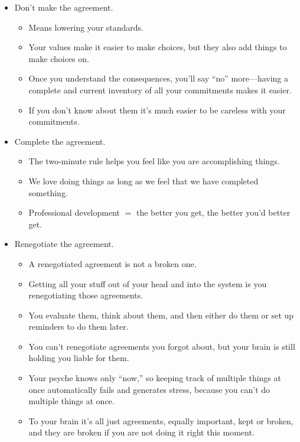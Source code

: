 \documentclass{article}
\begin{document}
\begin{itemize}
 \item Don't make the agreement.
 \begin{itemize}
  \item Means lowering your standards.
  \item Your values make it easier to make choices, but they also add things to make choices on.
  \item Once you understand the consequences, you'll say ``no'' more---having a complete and current inventory of all your commitments makes it easier.
  \item If you don't know about them it's much easier to be careless with your commitments.
 \end{itemize}
 \item Complete the agreement.
 \begin{itemize}
  \item The two-minute rule helps you feel like you are accomplishing things.
  \item We love doing things as long as we feel that we have completed something.
  \item Professional development $=$ the better you get, the better you'd better get.
 \end{itemize}
 \item Renegotiate the agreement.
 \begin{itemize}
  \item A renegotiated agreement is not a broken one.
  \item Getting all your stuff out of your head and into the system is you renegotiating those agreements.
  \item You evaluate them, think about them, and then either do them or set up reminders to do them later.
  \item You can't renegotiate agreements you forgot about, but your brain is still holding you liable for them.
  \item Your psyche knows only ``now,'' so keeping track of multiple things at once automatically fails and generates stress, because you can't do multiple things at once.
  \item To your brain it's all just agreements, equally important, kept or broken, and they are broken if you are not doing it right this moment.
 \end{itemize}
\end{itemize}
\end{document}
